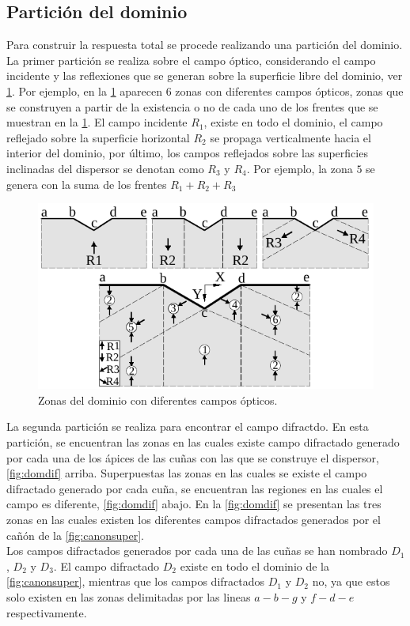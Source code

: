 \documentclass[spanish,letterpaper,12pt,twoside,openany]{article}
\begin{document}
\subsection{Partición del dominio}
%
Para construir la respuesta total se procede realizando una partición del dominio. La primer partición se realiza sobre el campo óptico, considerando el campo incidente y las reflexiones que se generan sobre la superficie libre del dominio, ver \cref{fig:domrays}. Por ejemplo, en la \cref{fig:domrays} aparecen $6$ zonas con diferentes campos ópticos, zonas que se construyen a partir de la existencia o no de cada uno de los frentes que se muestran en la \cref{fig:domrays}. El campo incidente $R_1$, existe en todo el dominio, el campo reflejado sobre la superficie horizontal $R_2$ se propaga verticalmente hacia el interior del dominio, por último, los campos reflejados sobre las superficies inclinadas del dispersor se denotan como $R_3$ y $R_4$. Por ejemplo, la zona $5$ se genera con la suma de los frentes $R_1+R_2+R_3$
%
\begin{figure}[H]
    \centering
    \includegraphics[width=10 cm]{img/dominiorays.pdf}
    \caption{Zonas del dominio con diferentes campos ópticos.}
    \label{fig:domrays}
\end{figure}
%
La segunda partición se realiza para encontrar el campo difractdo. En esta partición, se encuentran las zonas en las cuales existe campo difractado generado por cada una de los ápices de las cuñas con las que se construye el dispersor, \cref{fig:domdif} arriba. Superpuestas las zonas en las cuales se existe el campo difractado generado por cada cuña, se encuentran las regiones en las cuales el campo es diferente, \cref{fig:domdif} abajo. En la \cref{fig:domdif} se presentan las tres zonas en las cuales existen los diferentes campos difractados generados por el cañón de la \cref{fig:canonsuper}.\\
%
Los campos difractados generados por cada una de las cuñas se han nombrado $D_1$, $D_2$ y $D_3$. El campo difractado $D_2$ existe en todo el dominio de la \cref{fig:canonsuper}, mientras que los campos difractados $D_1$ y $D_2$ no, ya que estos solo existen en las zonas delimitadas por las lineas $a-b-g$ y $f-d-e$ respectivamente.
\end{document}
